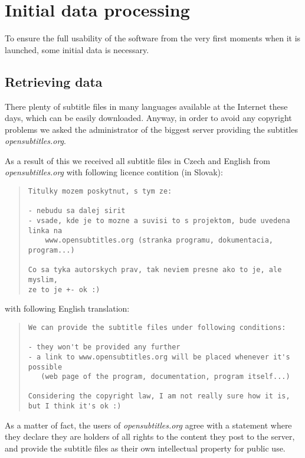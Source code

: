 \section{Initial data processing}

To ensure the full usability of the software from the very first moments when it is launched, some initial data is necessary.

\subsection{Retrieving data}

There plenty of subtitle files in many languages available at the Internet these days, which can be easily downloaded. Anyway, in order to avoid any copyright problems we asked the administrator of the biggest server providing the subtitles \emph{opensubtitles.org}.

As a result of this we received all subtitle files in Czech and English from \emph{opensubtitles.org} with following licence contition (in Slovak):

\begin{quote}
\begin{verbatim}
Titulky mozem poskytnut, s tym ze:

- nebudu sa dalej sirit
- vsade, kde je to mozne a suvisi to s projektom, bude uvedena linka na
    www.opensubtitles.org (stranka programu, dokumentacia, program...)

Co sa tyka autorskych prav, tak neviem presne ako to je, ale myslim,
ze to je +- ok :)
\end{verbatim}
\end{quote}

\noindent with following English translation:

\begin{quote}
\begin{verbatim}
We can provide the subtitle files under following conditions:

- they won't be provided any further
- a link to www.opensubtitles.org will be placed whenever it's possible 
   (web page of the program, documentation, program itself...)

Considering the copyright law, I am not really sure how it is, 
but I think it's ok :)
\end{verbatim}
\end{quote}

\noindent As a matter of fact, the users of \emph{opensubtitles.org} agree with a statement where they declare they are holders of all rights to the content they post to the server, and provide the subtitle files as their own intellectual property for public use. %

